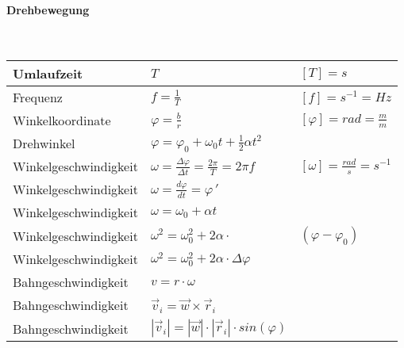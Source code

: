 \paragraph{Drehbewegung}\mbox{}\\
\noindent
\begin{tabularx}{\columnwidth}{@{}XXX@{}}
	Umlaufzeit                       & $T$                                                                  & $[T] = s$                              \\ \hline
	Frequenz                         & $f=\frac{1}{T}$                                                      & $[f] = s^{-1} = Hz$                    \\ \hline
	Winkelkoordinate                 & $\varphi = \frac{b}{r}$                                              & $[\varphi] = rad = \frac{m}{m}$        \\ \hline
	Drehwinkel                       & $\varphi = \varphi_0 + \omega_0 t + \frac{1}{2}\alpha t^2$                                                    \\ \hline
	Winkelgeschwindigkeit            & $\omega = \frac{\Delta \varphi}{\Delta t} = \frac{2\pi}{T} = 2\pi f$ & $[\omega] = \frac{rad}{s} = s^{-1}$    \\ \hline
	Winkelgeschwindigkeit            & $\omega = \frac{d\varphi}{dt} = \varphi\,'$                                                                   \\ \hline
	Winkelgeschwindigkeit            & $\omega = \omega_0 + \alpha t$                                                                                \\ \hline
	Winkelgeschwindigkeit            & $\omega^2 = \omega_0^2 + 2\alpha\cdot $                              & $\left(\varphi-\varphi_{0}\right)$     \\ \hline
	Winkelgeschwindigkeit            & $\omega^2 = \omega_0^2 + 2\alpha\cdot\Delta \varphi$                                                          \\ \hline
	Bahngeschwindigkeit              & $v = r\cdot \omega$                                                                                           \\ \hline
	Bahngeschwindigkeit              & $\vec{v}_i = \vec{w} \times \vec{r}_i$                                                                        \\ \hline
	Bahngeschwindigkeit              & $|\vec{v}_i| = |\vec{w}| \cdot |\vec{r}_i| \cdot sin(\varphi)$                                                \\ \hline

\end{tabularx}
